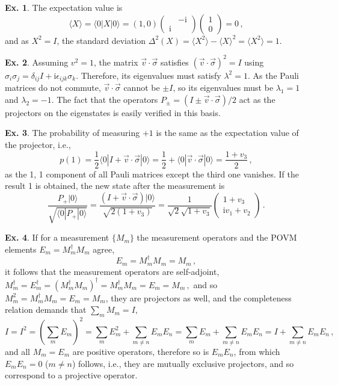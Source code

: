 \documentclass[a4paper,12pt]{article}
\def\imagi{\mathrm{i}}
\theoremstyle{definition}
\newtheorem{exercise}{Ex.}[section]
\begin{document}
\begin{exercise}
 The expectation value is
 \[
  \langle X\rangle = \langle 0 | X | 0 \rangle = (1, 0) \begin{pmatrix} & -\imagi \\ \imagi & \end{pmatrix} \begin{pmatrix} 1 \\ 0 \end{pmatrix} = 0\,,
 \]
 and as $X^2=I$, the standard deviation $\Delta^2(X) = \langle X^2\rangle-\langle X\rangle^2 = \langle X^2 \rangle =1$.
\end{exercise}

\begin{exercise}
 Assuming $v^2=1$, the matrix $\vec{v}\cdot\vec{\sigma}$ satisfies $(\vec{v}\cdot\vec{\sigma})^2=I$ using $\sigma_i \sigma_j = \delta_{ij}I+\imagi\epsilon_{ijk}\sigma_k$. Therefore, its eigenvalues must satisfy $\lambda^2=1$. As the Pauli matrices do not commute, $\vec{v}\cdot\vec{\sigma}$ cannot be $\pm I$, so its eigenvalues must be $\lambda_1=1$ and $\lambda_2=-1$. The fact that the operators $P_{\pm} = (I\pm \vec{v}\cdot\vec{\sigma})/2$ act as the projectors on the eigenstates is easily verified in this basis.
\end{exercise}

\begin{exercise}
 The probability of measuring $+1$ is the same as the expectation value of the projector, i.e.,
 \[
  p(1) = \frac{1}{2}\langle 0 | I + \vec{v}\cdot\vec{\sigma}|0\rangle = \frac{1}{2}+\langle 0 | \vec{v}\cdot\vec{\sigma}|0\rangle = \frac{1+v_3}{2}\,,
 \]
 as the 1, 1 component of all Pauli matrices except the third one vanishes. If the result 1 is obtained, the new state after the measurement is
 \[
\frac{P_+ |0\rangle}{\sqrt{\langle 0 | P_+ |0\rangle}}  = \frac{(I+\vec{v}\cdot\vec{\sigma})|0\rangle}{\sqrt{2(1+v_3)}} = \frac{1}{\sqrt 2\sqrt{1+v_3}}\begin{pmatrix} 1+v_3 \\ \imagi v_1 + v_2\end{pmatrix}\,.
 \]
\end{exercise}

\begin{exercise} If for a measurement $\{M_m\}$ the measurement operators and the POVM elements $E_m = M_m^\dagger M_m$ agree,
 \[
  E_m = M_m^\dagger M_m = M_m\,,
 \]
 it follows that the measurement operators are self-adjoint, $M_m^\dagger = E_m^\dagger = (M_m^\dagger M_m)^\dagger = M_m^\dagger M_m = E_m = M_m\,,$ and so $M_m^2 = M_m^\dagger M_m = E_m = M_m$, they are projectors as well, and the completeness relation demands that $\sum_m M_m = I$, 
 \[
  I = I^2 = \left(\sum_m E_m\right)^2 = \sum_m E_m^2 + \sum_{m\ne n} E_m E_n = \sum_m E_m + \sum_{m\ne n} E_m E_n = I + \sum_{m\ne n}E_m E_n\,,
 \]
 and all $M_m = E_m$ are positive operators, therefore so is $E_m E_n$, from which $E_m E_n = 0$ ($m\ne n$) follows, i.e.,
 they are mutually exclusive projectors, and so correspond to a projective operator.
\end{exercise}
\end{document}
